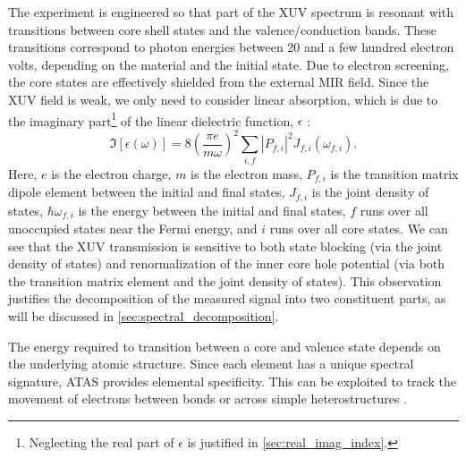 The experiment is engineered so that part of the XUV spectrum is resonant with transitions between core shell states and the valence/conduction bands. These transitions correspond to photon energies between 20 and a few hundred electron volts, depending on the material and the initial state. Due to electron screening, the core states are effectively shielded from the external MIR field. Since the XUV field is weak, we only need to consider linear absorption, which is due to the imaginary part\footnote{Neglecting the real part of $\epsilon$ is justified in \cref{sec:real_imag_index}.} of the linear dielectric function, $\epsilon$ \cite{kaplanFemtosecondTrackingCarrier2018}:
\begin{equation}
	\label{eqn:imag_linear_dielectric_func}
\Im \left[ \epsilon (\omega) \right] = 8 \left( \frac{\pi e}{m \omega}\right)^2 \sum_{i,f}  \left| P_{f,i} \right|^2 J_{f,i}(\omega_{f,i}).
\end{equation}
Here, $e$ is the electron charge, $m$ is the electron mass, $P_{f,i}$ is the transition matrix dipole element between the initial and final states, $J_{f,i}$ is the joint density of states, $\hbar \omega_{f,i}$ is the energy between the initial and final states, $f$ runs over all unoccupied states near the Fermi energy, and $i$ runs over all core states. We can see that the XUV transmission is sensitive to both state blocking (via the joint density of states) and renormalization of the inner core hole potential (via both the transition matrix element and the joint density of states). This observation justifies the decomposition of the measured signal into two constituent parts, as will be discussed in \cref{sec:spectral_decomposition}.

The energy required to transition between a core and valence state depends on the underlying atomic structure. Since each element has a unique spectral signature, ATAS provides elemental specificity. This can be exploited to track the movement of electrons between bonds or across simple heterostructures \cite{marshUltrafastTimeresolvedExtreme2018,cushingLayerresolvedUltrafastExtreme2020}.

